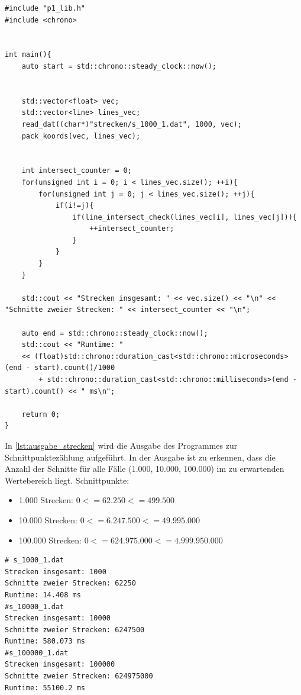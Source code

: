 \documentclass[12pt]{scrartcl}
\begin{document}
\begin{lstlisting}[style=CStyle, caption={strecken.cpp: Aufgruf der Bibliotheksfunktionen},captionpos=b]
#include "p1_lib.h"
#include <chrono>


int main(){
    auto start = std::chrono::steady_clock::now();


    std::vector<float> vec;
    std::vector<line> lines_vec;
    read_dat((char*)"strecken/s_1000_1.dat", 1000, vec);
    pack_koords(vec, lines_vec);


    int intersect_counter = 0;
    for(unsigned int i = 0; i < lines_vec.size(); ++i){
        for(unsigned int j = 0; j < lines_vec.size(); ++j){
            if(i!=j){
                if(line_intersect_check(lines_vec[i], lines_vec[j])){
                    ++intersect_counter;
                }
            }
        }
    }

    std::cout << "Strecken insgesamt: " << vec.size() << "\n" << "Schnitte zweier Strecken: " << intersect_counter << "\n";

    auto end = std::chrono::steady_clock::now();
    std::cout << "Runtime: "
    << (float)std::chrono::duration_cast<std::chrono::microseconds>(end - start).count()/1000
        + std::chrono::duration_cast<std::chrono::milliseconds>(end - start).count() << " ms\n";

    return 0;
}
\end{lstlisting}

In \autoref{lst:ausgabe_strecken} wird die Ausgabe des Programmes zur Schnittpunktezählung aufgeführt.
In der Ausgabe ist zu erkennen, dass die Anzahl der Schnitte für alle Fälle (1.000, 10.000, 100.000) im zu erwartenden Wertebereich liegt.
Schnittpunkte:
\begin{itemize}
    \item 1.000 Strecken: $0<= 62.250 <= 499.500$
    \item 10.000 Strecken: $0<= 6.247.500 <= 49.995.000$
    \item 100.000 Strecken: $0<= 624.975.000 <= 4.999.950.000$
\end{itemize}


\begin{lstlisting}[style=Terminal, caption={testing.cpp: Ausgabe Konsole},captionpos=b, label={lst:ausgabe_strecken}]
# s_1000_1.dat
Strecken insgesamt: 1000
Schnitte zweier Strecken: 62250
Runtime: 14.408 ms
#s_10000_1.dat
Strecken insgesamt: 10000
Schnitte zweier Strecken: 6247500
Runtime: 580.073 ms
#s_100000_1.dat
Strecken insgesamt: 100000
Schnitte zweier Strecken: 624975000
Runtime: 55100.2 ms
\end{lstlisting}
\end{document}

